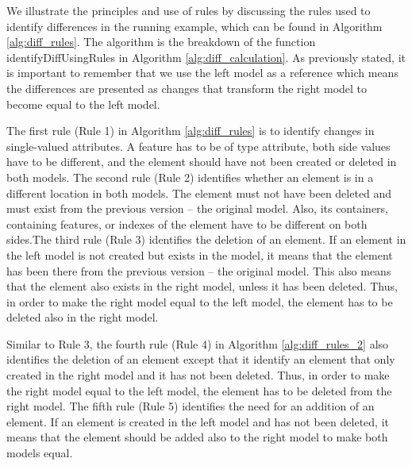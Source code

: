 We illustrate the principles and use of rules by discussing the rules used to identify differences in the running example, which can be found in Algorithm \ref{alg:diff_rules}. The algorithm is the breakdown of the function \textsf{identifyDiffUsingRules} in Algorithm \ref{alg:diff_calculation}. As previously stated, it is important to remember that we use the left model as a reference which means the differences are presented as changes that transform the right model to become equal to the left model. 

The first rule (Rule 1) in Algorithm \ref{alg:diff_rules} is to identify changes in single-valued attributes. A feature has to be of type \textsf{attribute}, both side values have to be different, and the element should have not been created or deleted in both models. The second rule (Rule 2) identifies whether an element is in a different location in both models. The element must not have been deleted and must exist from the previous version -- the original model. Also, its containers, containing features, or indexes of the element have to be different on both sides.The third rule (Rule 3) identifies the deletion of an element. If an element in the left model is not created but exists in the model, it means that the element has been there from the previous version -- the original model. This also means that the element also exists in the right model, unless it has been deleted. Thus, in order to make the right model equal to the left model, the element has to be deleted also in the right model. 

Similar to Rule 3, the fourth rule (Rule 4) in Algorithm \ref{alg:diff_rules_2} also identifies the deletion of an element except that it identify an element that only created in the right model and it has not been deleted. Thus, in order to make the right model equal to the left model, the element has to be deleted from the right model. The fifth rule (Rule 5) identifies the need for an addition of an element. If an element is created in the left model and has not been deleted, it means that the element should be added also to the right model to make both models equal.

